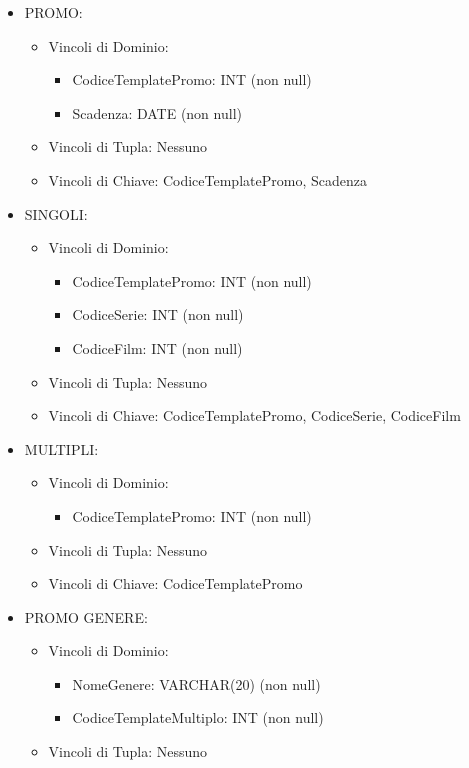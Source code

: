 \documentclass[a4paper,12pt]{report}
\begin{document}
\begin{itemize}
\begin{itemize}
	\end{itemize}
	\item PROMO:
	\begin{itemize}
		\item Vincoli di Dominio:
		\begin{itemize}
			\item CodiceTemplatePromo: INT (non null)
			\item Scadenza: DATE (non null)
		\end{itemize}
		\item Vincoli di Tupla: Nessuno
		\item Vincoli di Chiave: CodiceTemplatePromo, Scadenza
	\end{itemize}
	\item SINGOLI:
	\begin{itemize}
		\item Vincoli di Dominio:
		\begin{itemize}
			\item CodiceTemplatePromo: INT (non null)
			\item CodiceSerie: INT (non null)
			\item CodiceFilm: INT (non null)
		\end{itemize}
		\item Vincoli di Tupla: Nessuno
		\item Vincoli di Chiave: CodiceTemplatePromo, CodiceSerie, CodiceFilm
	\end{itemize}
	\item MULTIPLI:
	\begin{itemize}
		\item Vincoli di Dominio:
		\begin{itemize}
			\item CodiceTemplatePromo: INT (non null)
		\end{itemize}
		\item Vincoli di Tupla: Nessuno
		\item Vincoli di Chiave: CodiceTemplatePromo
	\end{itemize}
	\item PROMO GENERE:
	\begin{itemize}
		\item Vincoli di Dominio:
		\begin{itemize}
			\item NomeGenere: VARCHAR(20) (non null)
			\item CodiceTemplateMultiplo: INT (non null)
		\end{itemize}
		\item Vincoli di Tupla: Nessuno

\end{itemize}
\end{itemize}
\end{document}
